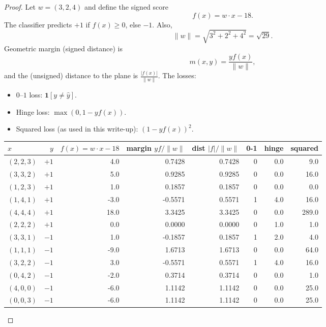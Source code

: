 \documentclass[en,hazy,blue,12pt,normal]{elegantnote}
\begin{document}
\begin{proof}
    Let $w=(3,2,4)$ and define the signed score
\[
f(x) = w\cdot x - 18.
\]
The classifier predicts $+1$ if $f(x)\ge 0$, else $-1$. Also,
\[
\lVert w\rVert = \sqrt{3^2+2^2+4^2}=\sqrt{29}.
\]
Geometric margin (signed distance) is
\[
m(x,y)= \frac{y f(x)}{\lVert w\rVert},
\]
and the (unsigned) distance to the plane is $\frac{|f(x)|}{\lVert w\rVert}$.
The losses:
\begin{itemize}
\item $0$--$1$ loss: $\mathbf{1}[y\ne \hat{y}]$.
\item Hinge loss: $\max(0, 1 - y f(x))$.
\item Squared loss (as used in this write-up): $(1 - y f(x))^2$.
\end{itemize}

\begin{tabular}{lrrrrrrr}
\toprule
$x$ & $y$ & $f(x)=w\cdot x-18$ & margin $y f/\lVert w\rVert$ & dist $|f|/\lVert w\rVert$ & 0-1 & hinge & squared \\
\midrule
$(2, 2, 3)$ & $+1$ & 4.0 & 0.7428 & 0.7428 & 0 & 0.0 & 9.0 \\
$(3, 3, 2)$ & $+1$ & 5.0 & 0.9285 & 0.9285 & 0 & 0.0 & 16.0 \\
$(1, 2, 3)$ & $+1$ & 1.0 & 0.1857 & 0.1857 & 0 & 0.0 & 0.0 \\
$(1, 4, 1)$ & $+1$ & -3.0 & -0.5571 & 0.5571 & 1 & 4.0 & 16.0 \\
$(4, 4, 4)$ & $+1$ & 18.0 & 3.3425 & 3.3425 & 0 & 0.0 & 289.0 \\
$(2, 2, 2)$ & $+1$ & 0.0 & 0.0000 & 0.0000 & 0 & 1.0 & 1.0 \\
$(3, 3, 1)$ & $-1$ & 1.0 & -0.1857 & 0.1857 & 1 & 2.0 & 4.0 \\
$(1, 1, 1)$ & $-1$ & -9.0 & 1.6713 & 1.6713 & 0 & 0.0 & 64.0 \\
$(3, 2, 2)$ & $-1$ & 3.0 & -0.5571 & 0.5571 & 1 & 4.0 & 16.0 \\
$(0, 4, 2)$ & $-1$ & -2.0 & 0.3714 & 0.3714 & 0 & 0.0 & 1.0 \\
$(4, 0, 0)$ & $-1$ & -6.0 & 1.1142 & 1.1142 & 0 & 0.0 & 25.0 \\
$(0, 0, 3)$ & $-1$ & -6.0 & 1.1142 & 1.1142 & 0 & 0.0 & 25.0 \\
\bottomrule
\end{tabular}%

\end{proof}
\end{document}
